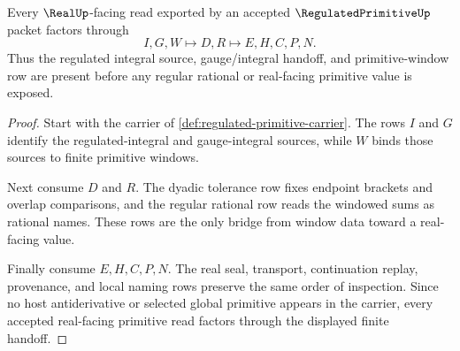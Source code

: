 \begin{theorem}
\label{thm:regulated-primitive-integral-handoff}
Every $\RealUp$-facing read exported by an accepted $\RegulatedPrimitiveUp$ packet factors through
$$
I,G,W \longmapsto D,R \longmapsto E,H,C,P,N .
$$
Thus the regulated integral source, gauge/integral handoff, and primitive-window row are present before any regular rational or real-facing primitive value is exposed.
\end{theorem}
\begin{proof}
Start with the carrier of \autoref{def:regulated-primitive-carrier}. The rows $I$ and $G$ identify the regulated-integral and gauge-integral sources, while $W$ binds those sources to finite primitive windows.

Next consume $D$ and $R$. The dyadic tolerance row fixes endpoint brackets and overlap comparisons, and the regular rational row reads the windowed sums as rational names. These rows are the only bridge from window data toward a real-facing value.

Finally consume $E,H,C,P,N$. The real seal, transport, continuation replay, provenance, and local naming rows preserve the same order of inspection. Since no host antiderivative or selected global primitive appears in the carrier, every accepted real-facing primitive read factors through the displayed finite handoff.
\end{proof}




